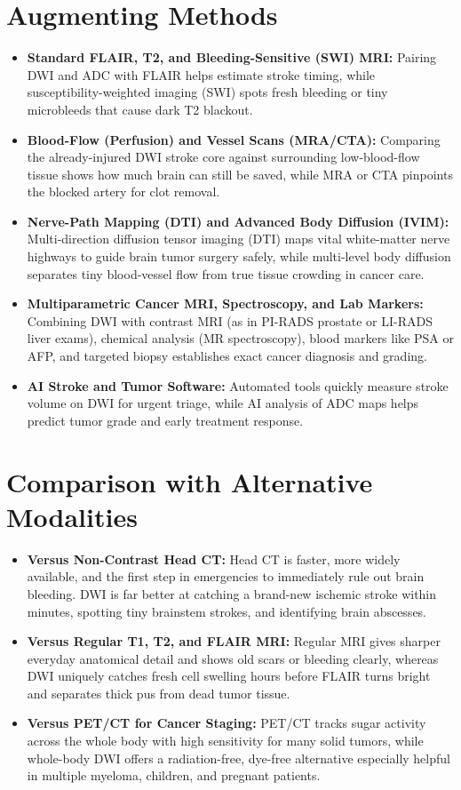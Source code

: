 \section{Augmenting Methods}
\begin{itemize}
\item \textbf{Standard FLAIR, T2, and Bleeding-Sensitive (SWI) MRI:} Pairing DWI and ADC with FLAIR helps estimate stroke timing, while susceptibility-weighted imaging (SWI) spots fresh bleeding or tiny microbleeds that cause dark T2 blackout.
\item \textbf{Blood-Flow (Perfusion) and Vessel Scans (MRA/CTA):} Comparing the already-injured DWI stroke core against surrounding low-blood-flow tissue shows how much brain can still be saved, while MRA or CTA pinpoints the blocked artery for clot removal.
\item \textbf{Nerve-Path Mapping (DTI) and Advanced Body Diffusion (IVIM):} Multi-direction diffusion tensor imaging (DTI) maps vital white-matter nerve highways to guide brain tumor surgery safely, while multi-level body diffusion separates tiny blood-vessel flow from true tissue crowding in cancer care.
\item \textbf{Multiparametric Cancer MRI, Spectroscopy, and Lab Markers:} Combining DWI with contrast MRI (as in PI-RADS prostate or LI-RADS liver exams), chemical analysis (MR spectroscopy), blood markers like PSA or AFP, and targeted biopsy establishes exact cancer diagnosis and grading.
\item \textbf{AI Stroke and Tumor Software:} Automated tools quickly measure stroke volume on DWI for urgent triage, while AI analysis of ADC maps helps predict tumor grade and early treatment response.
\end{itemize}

\section{Comparison with Alternative Modalities}
\begin{itemize}
\item \textbf{Versus Non-Contrast Head CT:} Head CT is faster, more widely available, and the first step in emergencies to immediately rule out brain bleeding. DWI is far better at catching a brand-new ischemic stroke within minutes, spotting tiny brainstem strokes, and identifying brain abscesses.
\item \textbf{Versus Regular T1, T2, and FLAIR MRI:} Regular MRI gives sharper everyday anatomical detail and shows old scars or bleeding clearly, whereas DWI uniquely catches fresh cell swelling hours before FLAIR turns bright and separates thick pus from dead tumor tissue.
\item \textbf{Versus PET/CT for Cancer Staging:} PET/CT tracks sugar activity across the whole body with high sensitivity for many solid tumors, while whole-body DWI offers a radiation-free, dye-free alternative especially helpful in multiple myeloma, children, and pregnant patients.
\end{itemize}

